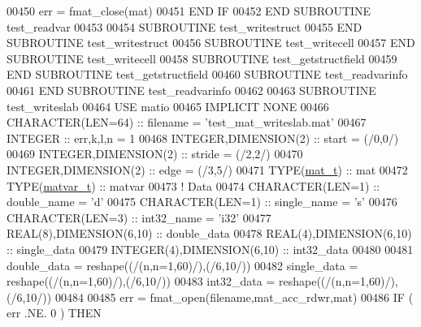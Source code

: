 \begin{DoxyCode}
{00450             err = fmat\_close(mat)
00451 \textcolor{keywordflow}{        END IF}
00452 \textcolor{keyword}{    END SUBROUTINE }test\_readvar
00453 
00454 \textcolor{keyword}{    SUBROUTINE }test\_writestruct
00455 \textcolor{keyword}{    END SUBROUTINE }test\_writestruct
00456 \textcolor{keyword}{    SUBROUTINE }test\_writecell
00457 \textcolor{keyword}{    END SUBROUTINE }test\_writecell
00458 \textcolor{keyword}{    SUBROUTINE }test\_getstructfield
00459 \textcolor{keyword}{    END SUBROUTINE }test\_getstructfield
00460 \textcolor{keyword}{    SUBROUTINE }test\_readvarinfo
00461 \textcolor{keyword}{    END SUBROUTINE }test\_readvarinfo
00462 
00463 \textcolor{keyword}{    SUBROUTINE }test\_writeslab
00464     \textcolor{keywordtype}{USE }matio
00465     \textcolor{keywordtype}{IMPLICIT NONE}
00466         \textcolor{keywordtype}{CHARACTER(LEN=64)}  :: filename = \textcolor{stringliteral}{'test\_mat\_writeslab.mat'}
00467         \textcolor{keywordtype}{INTEGER}            :: err,k,l,n = 1
00468         \textcolor{keywordtype}{INTEGER},\textcolor{keywordtype}{DIMENSION(2)} :: start  = (/0,0/)
00469         \textcolor{keywordtype}{INTEGER},\textcolor{keywordtype}{DIMENSION(2)} :: stride = (/2,2/)
00470         \textcolor{keywordtype}{INTEGER},\textcolor{keywordtype}{DIMENSION(2)} :: edge   = (/3,5/)
00471         \textcolor{keywordtype}{TYPE}(\hyperlink{group___m_a_t_gab0fc888f5a5d79943b16284b1f91c2e8}{mat\_t})        :: mat
00472         \textcolor{keywordtype}{TYPE}(\hyperlink{group___m_a_t_structmatvar__t}{matvar\_t})     :: matvar
00473         \textcolor{comment}{! Data}
00474         \textcolor{keywordtype}{CHARACTER(LEN=1)}           :: double\_name = \textcolor{stringliteral}{'d'}
00475         \textcolor{keywordtype}{CHARACTER(LEN=1)}           :: single\_name = \textcolor{stringliteral}{'s'}
00476         \textcolor{keywordtype}{CHARACTER(LEN=3)}           :: int32\_name  = \textcolor{stringliteral}{'i32'}
00477         \textcolor{keywordtype}{REAL(8)},\textcolor{keywordtype}{DIMENSION(6,10)}    :: double\_data
00478         \textcolor{keywordtype}{REAL(4)},\textcolor{keywordtype}{DIMENSION(6,10)}    :: single\_data
00479         \textcolor{keywordtype}{INTEGER(4)},\textcolor{keywordtype}{DIMENSION(6,10)} :: int32\_data
00480 
00481         double\_data = reshape((/(n,n=1,60)/),(/6,10/))
00482         single\_data = reshape((/(n,n=1,60)/),(/6,10/))
00483         int32\_data  = reshape((/(n,n=1,60)/),(/6,10/))
00484 
00485         err = fmat\_open(filename,mat\_acc\_rdwr,mat)
00486         \textcolor{keywordflow}{IF} ( err .NE. 0 ) \textcolor{keywordflow}{THEN}
}
\end{DoxyCode}
